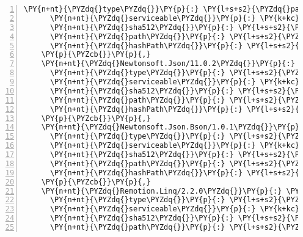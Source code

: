 \begin{Verbatim}[commandchars=\\\{\},numbers=left,firstnumber=1,stepnumber=1,numberblanklines=0]
      \PY{n+nt}{\PYZdq{}type\PYZdq{}}\PY{p}{:} \PY{l+s+s2}{\PYZdq{}package\PYZdq{}}\PY{p}{,}
      \PY{n+nt}{\PYZdq{}serviceable\PYZdq{}}\PY{p}{:} \PY{k+kc}{true}\PY{p}{,}
      \PY{n+nt}{\PYZdq{}sha512\PYZdq{}}\PY{p}{:} \PY{l+s+s2}{\PYZdq{}sha512\PYZhy{}j0BmmvaE6wdQVo0uzFrt4XXAuNcM3F20K36k9VeHq7E/5i3Lx6TPY1DdokD3kwG3bOO3OaMu9ZBGEk6prpcTOA==\PYZdq{}}\PY{p}{,}
      \PY{n+nt}{\PYZdq{}path\PYZdq{}}\PY{p}{:} \PY{l+s+s2}{\PYZdq{}microsoft.win32.registry/4.5.0\PYZhy{}rc1\PYZdq{}}\PY{p}{,}
      \PY{n+nt}{\PYZdq{}hashPath\PYZdq{}}\PY{p}{:} \PY{l+s+s2}{\PYZdq{}microsoft.win32.registry.4.5.0\PYZhy{}rc1.nupkg.sha512\PYZdq{}}
    \PY{p}{\PYZcb{}}\PY{p}{,}
    \PY{n+nt}{\PYZdq{}Newtonsoft.Json/11.0.2\PYZdq{}}\PY{p}{:} \PY{p}{\PYZob{}}
      \PY{n+nt}{\PYZdq{}type\PYZdq{}}\PY{p}{:} \PY{l+s+s2}{\PYZdq{}package\PYZdq{}}\PY{p}{,}
      \PY{n+nt}{\PYZdq{}serviceable\PYZdq{}}\PY{p}{:} \PY{k+kc}{true}\PY{p}{,}
      \PY{n+nt}{\PYZdq{}sha512\PYZdq{}}\PY{p}{:} \PY{l+s+s2}{\PYZdq{}sha512\PYZhy{}IvJe1pj7JHEsP8B8J8DwlMEx8UInrs/x+9oVY+oCD13jpLu4JbJU2WCIsMRn5C4yW9+DgkaO8uiVE5VHKjpmdQ==\PYZdq{}}\PY{p}{,}
      \PY{n+nt}{\PYZdq{}path\PYZdq{}}\PY{p}{:} \PY{l+s+s2}{\PYZdq{}newtonsoft.json/11.0.2\PYZdq{}}\PY{p}{,}
      \PY{n+nt}{\PYZdq{}hashPath\PYZdq{}}\PY{p}{:} \PY{l+s+s2}{\PYZdq{}newtonsoft.json.11.0.2.nupkg.sha512\PYZdq{}}
    \PY{p}{\PYZcb{}}\PY{p}{,}
    \PY{n+nt}{\PYZdq{}Newtonsoft.Json.Bson/1.0.1\PYZdq{}}\PY{p}{:} \PY{p}{\PYZob{}}
      \PY{n+nt}{\PYZdq{}type\PYZdq{}}\PY{p}{:} \PY{l+s+s2}{\PYZdq{}package\PYZdq{}}\PY{p}{,}
      \PY{n+nt}{\PYZdq{}serviceable\PYZdq{}}\PY{p}{:} \PY{k+kc}{true}\PY{p}{,}
      \PY{n+nt}{\PYZdq{}sha512\PYZdq{}}\PY{p}{:} \PY{l+s+s2}{\PYZdq{}sha512\PYZhy{}5PYT/IqQ+UK31AmZiSS102R6EsTo+LGTSI8bp7WAUqDKaF4wHXD8U9u4WxTI1vc64tYi++8p3dk3WWNqPFgldw==\PYZdq{}}\PY{p}{,}
      \PY{n+nt}{\PYZdq{}path\PYZdq{}}\PY{p}{:} \PY{l+s+s2}{\PYZdq{}newtonsoft.json.bson/1.0.1\PYZdq{}}\PY{p}{,}
      \PY{n+nt}{\PYZdq{}hashPath\PYZdq{}}\PY{p}{:} \PY{l+s+s2}{\PYZdq{}newtonsoft.json.bson.1.0.1.nupkg.sha512\PYZdq{}}
    \PY{p}{\PYZcb{}}\PY{p}{,}
    \PY{n+nt}{\PYZdq{}Remotion.Linq/2.2.0\PYZdq{}}\PY{p}{:} \PY{p}{\PYZob{}}
      \PY{n+nt}{\PYZdq{}type\PYZdq{}}\PY{p}{:} \PY{l+s+s2}{\PYZdq{}package\PYZdq{}}\PY{p}{,}
      \PY{n+nt}{\PYZdq{}serviceable\PYZdq{}}\PY{p}{:} \PY{k+kc}{true}\PY{p}{,}
      \PY{n+nt}{\PYZdq{}sha512\PYZdq{}}\PY{p}{:} \PY{l+s+s2}{\PYZdq{}sha512\PYZhy{}fK/76UmpC0FXBlGDFVPLJHQlDLYnGC+XY3eoDgCgbtrhi0vzbXDQ3n/IYHhqSKqXQfGw/u04A1drWs7rFVkRjw==\PYZdq{}}\PY{p}{,}
      \PY{n+nt}{\PYZdq{}path\PYZdq{}}\PY{p}{:} \PY{l+s+s2}{\PYZdq{}remotion.linq/2.2.0\PYZdq{}}\PY{p}{,}

\end{Verbatim}
